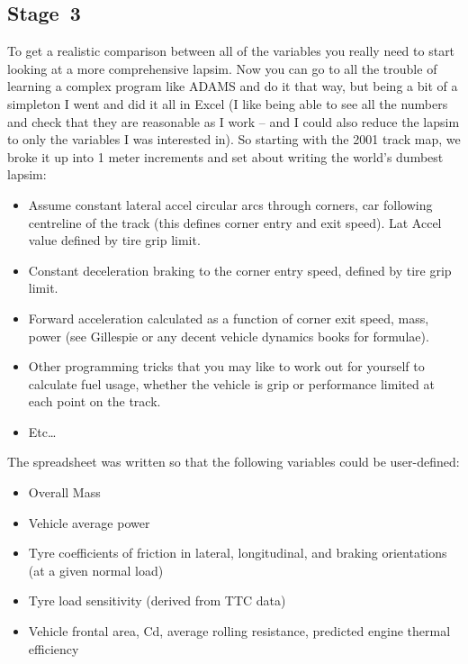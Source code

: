 \documentclass[10pt, a4paper, article, oneside, twocolumn, final]{memoir}
\begin{document}
\subsection*{Stage~3}
To get a realistic comparison between all of the variables you really need to start looking at a more comprehensive lapsim. Now you can go to all the trouble of learning a complex program like ADAMS and do it that way, but being a bit of a simpleton I went and did it all in Excel (I like being able to see all the numbers and check that they are reasonable as I work -- and I could also reduce the lapsim to only the variables I was interested in). So starting with the 2001 track map, we broke it up into 1 meter increments and set about writing the world’s dumbest lapsim: 

\begin{itemize}
    \item Assume constant lateral accel circular arcs through corners, car following centreline of the track (this defines corner entry and exit speed). Lat Accel value defined by tire grip limit. 
    \item Constant deceleration braking to the corner entry speed, defined by tire grip limit. 
    \item Forward acceleration calculated as a function of corner exit speed, mass, power (see Gillespie or any decent vehicle dynamics books for formulae).
    \item Other programming tricks that you may like to work out for yourself to calculate fuel usage, whether the vehicle is grip or performance limited at each point on the track.
    \item Etc\ldots 
\end{itemize}

The spreadsheet was written so that the following variables could be user-defined: 

\begin{itemize}
    \item Overall Mass 
    \item Vehicle average power 
    \item Tyre coefficients of friction in lateral, longitudinal, and braking orientations (at a given normal load) 
    \item Tyre load sensitivity (derived from TTC data) 
    \item Vehicle frontal area, \si{Cd}, average rolling resistance, predicted engine thermal efficiency     
\end{itemize}
\end{document}
